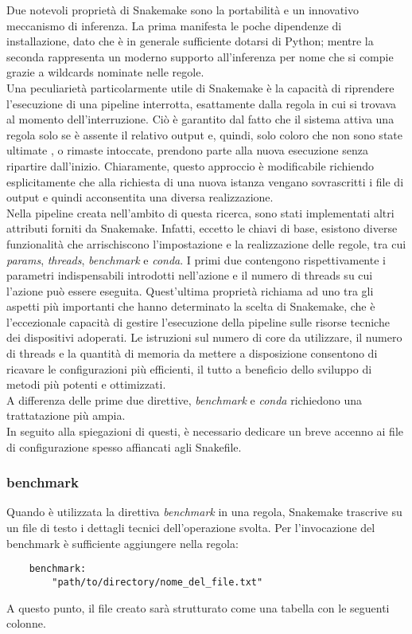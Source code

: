 Due notevoli proprietà di Snakemake sono la portabilità e un innovativo meccanismo di inferenza. La prima manifesta le poche dipendenze di installazione, dato che è in generale sufficiente dotarsi di Python; mentre la seconda rappresenta un moderno supporto all'inferenza per nome che si compie grazie a wildcards nominate nelle regole.\\
Una peculiarietà particolarmente utile di Snakemake è la capacità di riprendere l'esecuzione di una pipeline interrotta, esattamente dalla regola in cui si trovava al momento dell'interruzione. Ciò è garantito dal fatto che il sistema attiva una regola solo se è assente il relativo output e, quindi, solo coloro che non sono state ultimate , o rimaste intoccate, prendono parte alla nuova esecuzione senza ripartire dall'inizio. Chiaramente, questo approccio è modificabile richiendo esplicitamente che alla richiesta di una nuova istanza vengano sovrascritti i file di output e quindi acconsentita una diversa realizzazione. \\ 
Nella pipeline creata nell'ambito di questa ricerca, sono stati implementati altri attributi forniti da Snakemake. Infatti, eccetto le chiavi di base, esistono diverse funzionalità che arrischiscono l'impostazione e la realizzazione delle regole, tra cui \textit{params}, \textit{threads}, \textit{benchmark} e \textit{conda}. I primi due contengono rispettivamente i parametri indispensabili introdotti nell'azione e il numero di threads su cui l'azione può essere eseguita. Quest'ultima proprietà richiama ad uno tra gli aspetti più importanti che hanno determinato la scelta di Snakemake, che è  l'eccezionale capacità di gestire l'esecuzione della pipeline sulle risorse tecniche dei dispositivi adoperati. Le istruzioni sul numero di core da utilizzare, il numero di threads e la quantità di memoria da mettere a disposizione consentono di ricavare le configurazioni più efficienti, il tutto a beneficio dello sviluppo di metodi più potenti e ottimizzati. \\
A differenza delle prime due direttive, \textit{benchmark} e \textit{conda} richiedono una trattatazione più ampia. \\
In seguito alla spiegazioni di questi, è necessario dedicare un breve accenno ai file di configurazione spesso affiancati agli Snakefile.  

\subsubsection{benchmark}
Quando è utilizzata la direttiva \textit{benchmark} in una regola, Snakemake trascrive su un file di testo i dettagli tecnici dell'operazione svolta. Per l'invocazione del benchmark è sufficiente aggiungere nella regola:
\begin{lstlisting}
	benchmark:
		"path/to/directory/nome_del_file.txt"
\end{lstlisting}
A questo punto, il file creato sarà strutturato come una tabella con le seguenti colonne.

